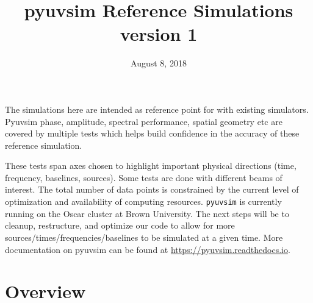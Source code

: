 \documentclass{article}
\date{August 8, 2018}
\title{pyuvsim Reference Simulations \\ version 1}
\begin{document}
\maketitle
The simulations here are intended as reference point for with existing simulators. Pyuvsim phase, amplitude, spectral performance, spatial geometry etc are covered by multiple tests which helps build confidence in the accuracy of these reference simulation.

These tests span axes chosen to highlight important physical directions (time, frequency, baselines, sources). Some tests are done with different beams of interest. The total number of data points is constrained by the current level of optimization and availability of computing resources. \texttt{pyuvsim} is currently running on the Oscar cluster at Brown University. The next steps will be to cleanup, restructure, and optimize our code to allow for more sources/times/frequencies/baselines to be simulated at a given time. More documentation on pyuvsim can be found at \url{https://pyuvsim.readthedocs.io}.

\section*{Overview}

\begin{table}[h!]
\hspace*{-.75in}
\end{table}
\end{document}
